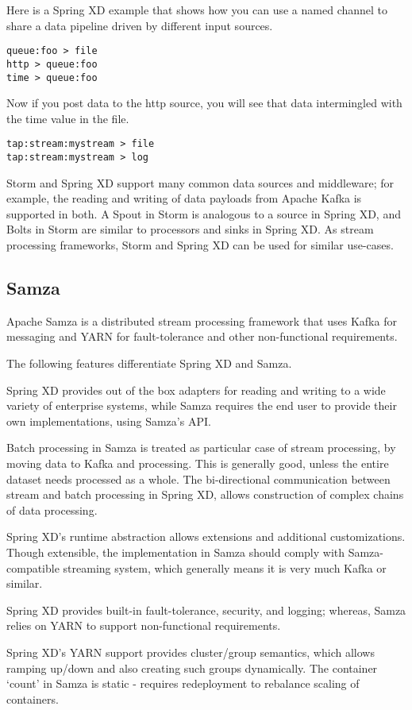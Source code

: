 Here is a Spring XD example that shows how you can use a named channel to share
a data pipeline driven by different input sources.

\begin{lstlisting}
queue:foo > file
http > queue:foo
time > queue:foo
\end{lstlisting}

Now if you post data to the http source, you will see that data intermingled
with the time value in the file.

\begin{lstlisting}
tap:stream:mystream > file
tap:stream:mystream > log
\end{lstlisting}

Storm and Spring XD support many common data sources and middleware;
for example, the reading and writing of data payloads from Apache Kafka
is supported in both. A Spout in Storm is analogous to a
source in Spring XD, and Bolts in Storm are similar to processors and sinks
in Spring XD. As stream processing frameworks, Storm and Spring XD can be used for
similar use-cases.

\subsection{Samza}
Apache Samza\cite{samza} is a distributed stream processing framework that uses
Kafka for messaging and YARN for fault-tolerance and other non-functional
requirements.

The following features differentiate Spring XD and Samza.

\begin{itemize*}
\item Spring XD provides out of the box adapters for reading and writing to a wide
variety of enterprise systems, while Samza requires the end user to provide their
own implementations, using Samza's API.
\item Batch processing in Samza is treated as particular case of stream
processing, by moving data to Kafka and processing. This is generally good,
unless the entire dataset needs processed as a whole. The bi-directional
communication between stream and batch processing in Spring XD, allows construction
of complex chains of data processing.
\item Spring XD's runtime abstraction allows extensions and additional
customizations. Though extensible, the implementation in Samza should comply with
Samza-compatible streaming system, which generally means it is very much Kafka
or similar.
\item Spring XD provides built-in fault-tolerance, security, and logging; whereas,
Samza relies on YARN to support non-functional requirements.
\item Spring XD's YARN support provides cluster/group semantics, which allows
ramping up/down and also creating such groups dynamically. The container `count'
in Samza is static - requires redeployment to rebalance scaling of containers.
\end{itemize*}

